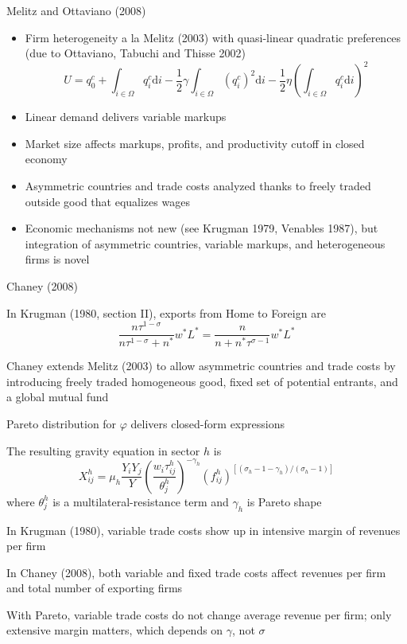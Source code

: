 \documentclass[10pt,notes=hide]{beamer}
\begin{document}
\begin{frame}{Melitz and Ottaviano (2008)}
\begin{itemize}
	\item Firm heterogeneity a la Melitz (2003) with quasi-linear quadratic preferences 
	(due to Ottaviano, Tabuchi and Thisse 2002)
	\begin{equation*}
		U = 
		q_0^c 
		+ \int_{i\in \Omega} q_i^c \textrm{d}i 
		- \frac{1}{2} \gamma \int_{i\in \Omega} \left(q_i^c\right)^2 \textrm{d}i 
		- \frac{1}{2} \eta \left(\int_{i\in \Omega} q_i^c \textrm{d}i\right)^2
	\end{equation*}
	\item Linear demand delivers variable markups
	\item Market size affects markups, profits, and productivity cutoff in closed economy
	\item Asymmetric countries and trade costs analyzed thanks to freely traded outside good that equalizes wages
	\item Economic mechanisms not new (see Krugman 1979, Venables 1987), but integration of asymmetric countries, variable markups, and heterogeneous firms is novel
\end{itemize}
\end{frame}
\begin{frame}{Chaney (2008)}
\begin{itemize}
{\small
	\item In Krugman (1980, section II), exports from Home to Foreign are
	$$
	\frac{n \tau^{1-\sigma}}{n \tau^{1-\sigma} + n^*} w^*L^*
	=
	\frac{n}{n+n^* \tau^{\sigma-1}} w^*L^*
	$$
	\item Chaney extends Melitz (2003) to allow asymmetric countries and trade costs by introducing freely traded homogeneous good, fixed set of potential entrants, and a global mutual fund
	\item Pareto distribution for $\varphi$ delivers closed-form expressions
	\item The resulting gravity equation in sector $h$ is
	$$
	X_{ij}^{h}= \mu_h \frac{Y_i Y_j}{Y}
	\left(\frac{w_i \tau_{ij}^h}{\theta_j^h}\right)^{-\gamma_h}
	\left(f_{ij}^{h}\right)^{[(\sigma_h-1-\gamma_h)/(\sigma_h-1)]}
	$$
	where $\theta_j^h$ is a multilateral-resistance term and $\gamma_h$ is Pareto shape 
	\item In Krugman (1980), variable trade costs show up in intensive margin of revenues per firm
	\item In Chaney (2008), both variable and fixed trade costs affect revenues per firm and total number of exporting firms
	\item With Pareto, variable trade costs do not change average revenue per firm; only extensive margin matters, which depends on $\gamma$, not $\sigma$
}
\end{itemize}
\end{frame}
\end{document}
